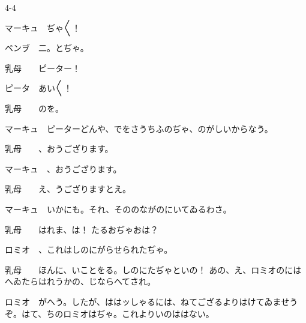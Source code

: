 \documentclass[tate,paper=b6j,jafontsize=9pt]{jlreq}
\begin{document}
\begin{azconvIndented}{4\zw}{-4\zw}

マーキュ　ぢゃ{〳〵}！

ベンヺ　二。とぢゃ。

乳母　　ピーター！

ピータ　あい{〳〵}！

乳母　　のを。

マーキュ　ピーターどんや、でをさうちふのぢゃ、のがしいからなう。

乳母　　、おうござります。

マーキュ　、おうござります。

乳母　　え、うござりますとえ。

マーキュ　いかにも。それ、そののながのにいてゐるわさ。

乳母　　はれま、は！ たるおぢゃおは？

ロミオ　、これはしのにがらせられたぢゃ。

乳母　　ほんに、いことをる。しのにたぢゃといの！ あの、え、ロミオのにはへゐたらはれうかの、じならへてされ。

ロミオ　がへう。したが、ははッしゃるには、ねてござるよりはけてゐませうぞ。はて、ちのロミオはぢゃ。これよりいのははない。


\end{azconvIndented}
\end{document}
